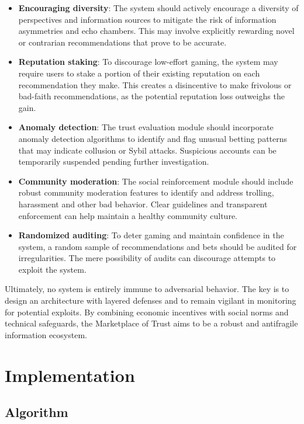 \documentclass{article}
\begin{document}
\begin{itemize}
    \item \textbf{Encouraging diversity}: The system should actively encourage a diversity of perspectives and information sources to mitigate the risk of information asymmetries and echo chambers. This may involve explicitly rewarding novel or contrarian recommendations that prove to be accurate.
    \item \textbf{Reputation staking}: To discourage low-effort gaming, the system may require users to stake a portion of their existing reputation on each recommendation they make. This creates a disincentive to make frivolous or bad-faith recommendations, as the potential reputation loss outweighs the gain.
    \item \textbf{Anomaly detection}: The trust evaluation module should incorporate anomaly detection algorithms to identify and flag unusual betting patterns that may indicate collusion or Sybil attacks. Suspicious accounts can be temporarily suspended pending further investigation.  
    \item \textbf{Community moderation}: The social reinforcement module should include robust community moderation features to identify and address trolling, harassment and other bad behavior. Clear guidelines and transparent enforcement can help maintain a healthy community culture.
    \item \textbf{Randomized auditing}: To deter gaming and maintain confidence in the system, a random sample of recommendations and bets should be audited for irregularities. The mere possibility of audits can discourage attempts to exploit the system.
\end{itemize}

Ultimately, no system is entirely immune to adversarial behavior. The key is to design an architecture with layered defenses and to remain vigilant in monitoring for potential exploits. By combining economic incentives with social norms and technical safeguards, the Marketplace of Trust aims to be a robust and antifragile information ecosystem. 


\section{Implementation}

\subsection{Algorithm}
\end{document}
